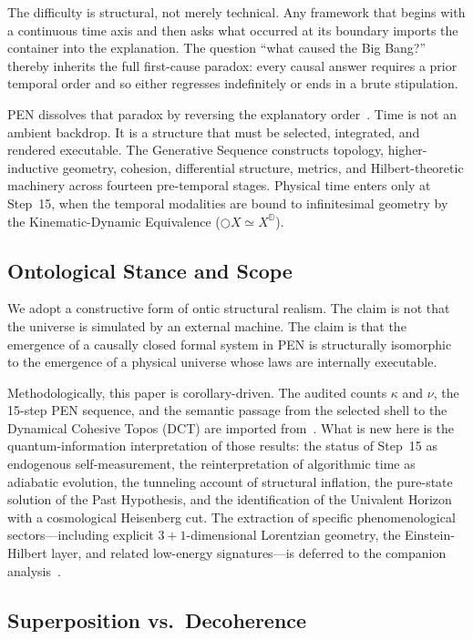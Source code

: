 \documentclass[11pt,a4paper]{article}
\theoremstyle{plain}
\theoremstyle{definition}
\theoremstyle{remark}
\newcommand{\D}{\mathbb{D}}
\newcommand{\nextmod}{\bigcirc}
\begin{document}
The difficulty is structural, not merely technical.
Any framework that begins with a continuous time axis and then asks what occurred at its boundary imports the container into the explanation.
The question ``what caused the Big Bang?'' thereby inherits the full first-cause paradox: every causal answer requires a prior temporal order and so either regresses indefinitely or ends in a brute stipulation.

PEN dissolves that paradox by reversing the explanatory order~\cite{pen}.
Time is not an ambient backdrop.
It is a structure that must be selected, integrated, and rendered executable.
The Generative Sequence constructs topology, higher-inductive geometry, cohesion, differential structure, metrics, and Hilbert-theoretic machinery across fourteen pre-temporal stages.
Physical time enters only at Step~15, when the temporal modalities are bound to infinitesimal geometry by the Kinematic-Dynamic Equivalence ($\nextmod X \simeq X^{\D}$).

\subsection{Ontological Stance and Scope}
\label{sec:stance}

We adopt a constructive form of ontic structural realism.
The claim is not that the universe is simulated by an external machine.
The claim is that the emergence of a causally closed formal system in PEN is structurally isomorphic to the emergence of a physical universe whose laws are internally executable.

Methodologically, this paper is corollary-driven.
The audited counts $\kappa$ and $\nu$, the 15-step PEN sequence, and the semantic passage from the selected shell to the Dynamical Cohesive Topos (DCT) are imported from~\cite{pen}.
What is new here is the quantum-information interpretation of those results: the status of Step~15 as endogenous self-measurement, the reinterpretation of algorithmic time as adiabatic evolution, the tunneling account of structural inflation, the pure-state solution of the Past Hypothesis, and the identification of the Univalent Horizon with a cosmological Heisenberg cut.
The extraction of specific phenomenological sectors---including explicit $3+1$-dimensional Lorentzian geometry, the Einstein-Hilbert layer, and related low-energy signatures---is deferred to the companion analysis~\cite{gr-companion}.

\subsection{Superposition vs.\ Decoherence}
\label{sec:superposition-decoherence}
\end{document}
